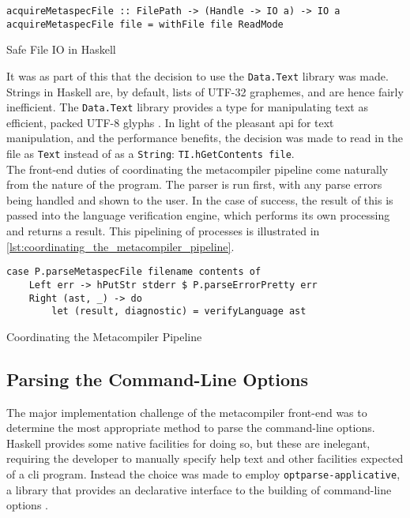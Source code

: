 \begin{listing}[!htb]
\begin{verbatim}
acquireMetaspecFile :: FilePath -> (Handle -> IO a) -> IO a
acquireMetaspecFile file = withFile file ReadMode
\end{verbatim}
\caption{Safe File IO in Haskell}
\label{lst:safe_file_io_in_haskell}
\end{listing}

It was as part of this that the decision to use the \texttt{Data.Text} library was made. 
Strings in Haskell are, by default, lists of UTF-32 graphemes, and are hence fairly inefficient. 
The \texttt{Data.Text} library provides a type for manipulating text as efficient, packed UTF-8 glyphs \citep{haskell_data_text}.
In light of the pleasant \gls{api} for text manipulation, and the performance benefits, the decision was made to read in the file as \texttt{Text} instead of as a \texttt{String}: \texttt{TI.hGetContents file}.\\

The front-end duties of coordinating the metacompiler pipeline come naturally from the nature of the program.
The parser is run first, with any parse errors being handled and shown to the user.
In the case of success, the result of this is passed into the language verification engine, which performs its own processing and returns a result.
This pipelining of processes is illustrated in \autoref{lst:coordinating_the_metacompiler_pipeline}.

\begin{listing}[!htb]
\begin{verbatim}
case P.parseMetaspecFile filename contents of
    Left err -> hPutStr stderr $ P.parseErrorPretty err
    Right (ast, _) -> do
        let (result, diagnostic) = verifyLanguage ast
\end{verbatim}
\caption{Coordinating the Metacompiler Pipeline}
\label{lst:coordinating_the_metacompiler_pipeline}
\end{listing}

\subsection{Parsing the Command-Line Options} %
\label{sub:parsing_the_command_line_options}
The major implementation challenge of the metacompiler front-end was to determine the most appropriate method to parse the command-line options.
Haskell provides some native facilities for doing so, but these are inelegant, requiring the developer to manually specify help text and other facilities expected of a \gls{cli} program.
Instead the choice was made to employ \texttt{optparse-applicative}, a library that provides an declarative interface to the building of command-line options \citep{optparse_applicative}.\\

